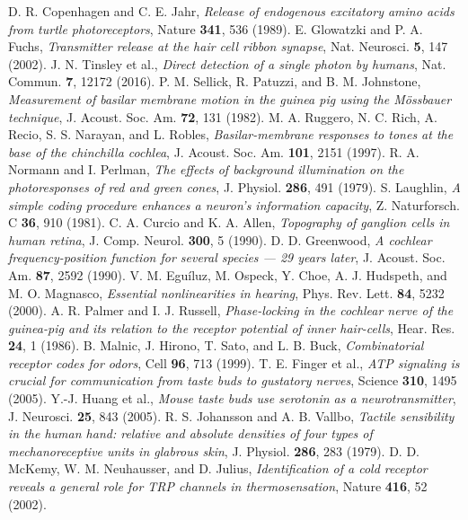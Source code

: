  D. R. Copenhagen and C. E. Jahr, \emph{Release of endogenous excitatory amino acids from turtle photoreceptors}, Nature \textbf{341}, 536 (1989).
 E. Glowatzki and P. A. Fuchs, \emph{Transmitter release at the hair cell ribbon synapse}, Nat. Neurosci. \textbf{5}, 147 (2002).
 J. N. Tinsley et al., \emph{Direct detection of a single photon by humans}, Nat. Commun. \textbf{7}, 12172 (2016).
 P. M. Sellick, R. Patuzzi, and B. M. Johnstone, \emph{Measurement of basilar membrane motion in the guinea pig using the M\"ossbauer technique}, J. Acoust. Soc. Am. \textbf{72}, 131 (1982).
 M. A. Ruggero, N. C. Rich, A. Recio, S. S. Narayan, and L. Robles, \emph{Basilar-membrane responses to tones at the base of the chinchilla cochlea}, J. Acoust. Soc. Am. \textbf{101}, 2151 (1997).
 R. A. Normann and I. Perlman, \emph{The effects of background illumination on the photoresponses of red and green cones}, J. Physiol. \textbf{286}, 491 (1979).
 S. Laughlin, \emph{A simple coding procedure enhances a neuron's information capacity}, Z. Naturforsch. C \textbf{36}, 910 (1981).
 C. A. Curcio and K. A. Allen, \emph{Topography of ganglion cells in human retina}, J. Comp. Neurol. \textbf{300}, 5 (1990).
 D. D. Greenwood, \emph{A cochlear frequency-position function for several species --- 29 years later}, J. Acoust. Soc. Am. \textbf{87}, 2592 (1990).
 V. M. Egu\'iluz, M. Ospeck, Y. Choe, A. J. Hudspeth, and M. O. Magnasco, \emph{Essential nonlinearities in hearing}, Phys. Rev. Lett. \textbf{84}, 5232 (2000).
 A. R. Palmer and I. J. Russell, \emph{Phase-locking in the cochlear nerve of the guinea-pig and its relation to the receptor potential of inner hair-cells}, Hear. Res. \textbf{24}, 1 (1986).
 B. Malnic, J. Hirono, T. Sato, and L. B. Buck, \emph{Combinatorial receptor codes for odors}, Cell \textbf{96}, 713 (1999).
 T. E. Finger et al., \emph{ATP signaling is crucial for communication from taste buds to gustatory nerves}, Science \textbf{310}, 1495 (2005).
 Y.-J. Huang et al., \emph{Mouse taste buds use serotonin as a neurotransmitter}, J. Neurosci. \textbf{25}, 843 (2005).
 R. S. Johansson and A. B. Vallbo, \emph{Tactile sensibility in the human hand: relative and absolute densities of four types of mechanoreceptive units in glabrous skin}, J. Physiol. \textbf{286}, 283 (1979).
 D. D. McKemy, W. M. Neuhausser, and D. Julius, \emph{Identification of a cold receptor reveals a general role for TRP channels in thermosensation}, Nature \textbf{416}, 52 (2002).
